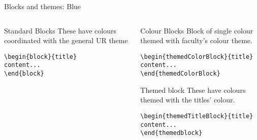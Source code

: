 \begingroup
{}
\begin{frame}[fragile]{Blocks and themes: Blue}
\begin{columns} %
\begin{column}{0.3\textwidth}
\begin{block}{Standard Blocks}
These have colours coordinated with the general UR theme
\begin{verbatim}
\begin{block}{title}
content...
\end{block}
\end{verbatim}
\end{block}
\end{column}
\begin{column}{0.7\textwidth}
\begin{themedColorBlock}{Colour Blocks}
Block of single colour themed with faculty's colour theme.
\small
\begin{verbatim}
\begin{themedColorBlock}{title}
content...
\end{themedColorBlock}
\end{verbatim}
\end{themedColorBlock}
\begin{themedTitleBlock} {Themed block}
These have colours themed with the titles' colour.
\small
\begin{verbatim}
\begin{themedTitleBlock}{title}
content...
\end{themedblock}
\end{verbatim}
\end{themedTitleBlock}
\end{column}
\end{columns}
\end{frame}
\endgroup